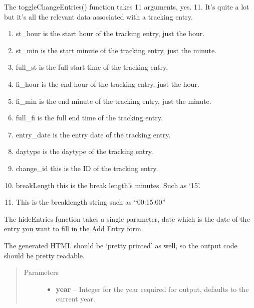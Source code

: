 \documentclass[letterpaper,10pt,english]{sphinxmanual}
\begin{document}
\begin{fulllineitems}
The toggleChangeEntries() function takes 11 arguments, yes. 11. It's quite
a lot but it's all the relevant data associated with a tracking entry.
\begin{enumerate}
\item {} 
st\_hour is the start hour of the tracking entry, just the hour.

\item {} 
st\_min is the start minute of the tracking entry, just the minute.

\item {} 
full\_st is the full start time of the tracking entry.

\item {} 
fi\_hour is the end hour of the tracking entry, just the hour.

\item {} 
fi\_min is the end minute of the tracking entry, just the minute.

\item {} 
full\_fi is the full end time of the tracking entry.

\item {} 
entry\_date is the entry date of the tracking entry.

\item {} 
daytype is the daytype of the tracking entry.

\item {} 
change\_id this is the ID of the tracking entry.

\item {} 
breakLength this is the break length's minutes. Such as `15'.

\item {} 
This is the breaklength string such as ``00:15:00''

\end{enumerate}

The hideEntries function takes a single parameter, date which is the date of
the entry you want to fill in the Add Entry form.

The generated HTML should be `pretty printed' as well, so the output code
should be pretty readable.
\begin{quote}\begin{description}
\item[{Parameters}] \leavevmode\begin{itemize}
\item {} 
\textbf{year} -- Integer for the year required for output, defaults to the
current year.


\end{itemize}
\end{description}
\end{quote}
\end{fulllineitems}
\end{document}
